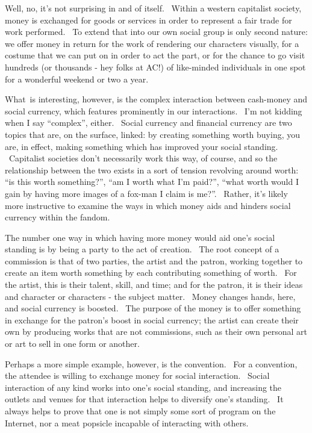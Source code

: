 Well, no, it's not surprising in and of itself. ~Within a western
capitalist society, money is exchanged for goods or services in order to
represent a fair trade for work performed. ~To extend that into our own
social group is only second nature: we offer money in return for the
work of rendering our characters visually, for a costume that we can put
on in order to act the part, or for the chance to go visit hundreds (or
thousands - hey folks at AC!) of like-minded individuals in one spot for
a wonderful weekend or two a year.

What~is interesting, however, is the complex interaction between
cash-money and social currency, which features prominently in our
interactions. ~I'm not kidding when I say ``complex'', either. ~Social
currency and financial currency are two topics that are, on the surface,
linked: by creating something worth buying, you are, in effect, making
something which has improved your social standing. ~Capitalist societies
don't necessarily work this way, of course, and so the relationship
between the two exists in a sort of tension revolving around worth: ``is
this worth something?'', ``am I worth what I'm paid?'', ``what worth
would I gain by having more images of a fox-man I claim is me?''.
~Rather, it's likely more instructive to examine the ways in which money
aids and hinders social currency within the fandom.

The number one way in which having more money would aid one's social
standing is by being a party to the act of creation. ~The root concept
of a commission is that of two parties, the artist and the patron,
working together to create an item worth something by each contributing
something of worth. ~For the artist, this is their talent, skill, and
time; and for the patron, it is their ideas and character or characters
- the subject matter. ~Money changes hands, here, and social currency is
boosted. ~The purpose of the money is to offer something in exchange for
the patron's boost in social currency; the artist can create their own
by producing works that are not commissions, such as their own personal
art or art to sell in one form or another.

Perhaps a more simple example, however, is the convention. ~For a
convention, the attendee is willing to exchange money for social
interaction. ~Social interaction of any kind works into one's social
standing, and increasing the outlets and venues for that interaction
helps to diversify one's standing. ~It always helps to prove that one is
not simply some sort of program on the Internet, nor a meat popsicle
incapable of interacting with others.

